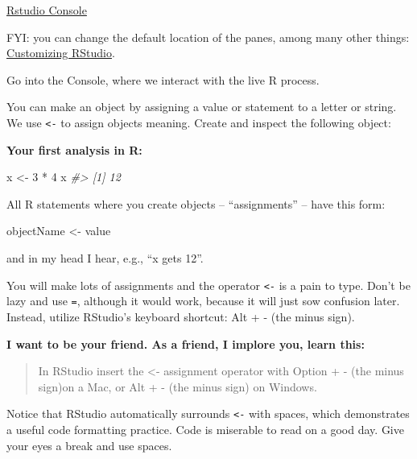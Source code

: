 \documentclass[
]{book}
\newenvironment{Shaded}{\begin{snugshade}}{\end{snugshade}}
\newcommand{\CommentTok}[1]{\textcolor[rgb]{0.56,0.35,0.01}{\textit{#1}}}
\newcommand{\DecValTok}[1]{\textcolor[rgb]{0.00,0.00,0.81}{#1}}
\newcommand{\NormalTok}[1]{#1}
\newcommand{\OtherTok}[1]{\textcolor[rgb]{0.56,0.35,0.01}{#1}}
\newcommand{\SpecialCharTok}[1]{\textcolor[rgb]{0.00,0.00,0.00}{#1}}
\begin{document}
\href{http://www.sthda.com/sthda/RDoc/images/rstudio.png}{Rstudio Console}

FYI: you can change the default location of the panes, among many other things: \href{https://support.rstudio.com/hc/en-us/articles/200549016-Customizing-the-RStudio-IDE}{Customizing RStudio}.

Go into the Console, where we interact with the live R process.

You can make an object by assigning a value or statement to a letter or string. We use \texttt{\textless{}-} to assign objects meaning. Create and inspect the following object:

\textbf{Your first analysis in R:}

\begin{Shaded}
\begin{Highlighting}[]
\NormalTok{x }\OtherTok{\textless{}{-}} \DecValTok{3} \SpecialCharTok{*} \DecValTok{4}
\NormalTok{x}
\CommentTok{\#\textgreater{} [1] 12}
\end{Highlighting}
\end{Shaded}

All R statements where you create objects -- ``assignments'' -- have this form:

\begin{Shaded}
\begin{Highlighting}[]
\NormalTok{objectName }\OtherTok{\textless{}{-}}\NormalTok{ value}
\end{Highlighting}
\end{Shaded}

and in my head I hear, e.g., ``x gets 12''.

You will make lots of assignments and the operator \texttt{\textless{}-} is a pain to type. Don't be lazy and use \texttt{=}, although it would work, because it will just sow confusion later. Instead, utilize RStudio's keyboard shortcut: Alt + - (the minus sign).

\textbf{I want to be your friend. As a friend, I implore you, learn this:}

\begin{quote}
In RStudio insert the \textless- assignment operator with Option + - (the minus sign)on a Mac, or Alt + - (the minus sign) on Windows.
\end{quote}

Notice that RStudio automatically surrounds \texttt{\textless{}-} with spaces, which demonstrates a useful code formatting practice. Code is miserable to read on a good day. Give your eyes a break and use spaces.
\end{document}
